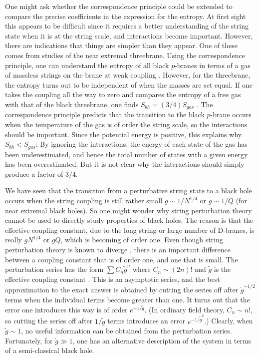 One might ask whether the correspondence principle could be extended to compare
the precise coefficients in the expression for the entropy. At first sight
this appears to be difficult since it requires a better understanding
of the string state when it is at the string scale, and interactions become
important. However,
there are indications that things are simpler than they appear.
One of these comes from studies of the near extremal threebrane.
Using the correspondence principle, one can understand the entropy of
all black $p$-branes in terms of a gas of massless strings on the brane
at weak coupling \cite{hopo}. However, for the threebrane, the entropy
turns out to be independent of when the masses are set equal. If one
takes the coupling all the way to zero and compares the entropy of a
free gas with that of the  black threebrane, one finds $S_{bh} = (3/4) S_{gas}$
\cite{gkp}.
The correspondence principle predicts that
the transition to the black $p$-brane occurs when the temperature
of the gas is of order the string scale, so the interactions should be
important. Since the potential energy is positive, 
this explains why $S_{bh} < S_{gas}$: 
By ignoring the interactions,
the energy of each state of the gas
has been underestimated, and hence the total number
of states with a given energy has been overestimated. But it is not clear
why the interactions  should simply produce a factor of $3/4$.

We have seen that the transition from a perturbative string state to
a black hole occurs when the string coupling is still rather small
$g\sim 1/ N^{1/4}$ or $g\sim 1/Q$ (for near extremal black holes).
So one might wonder why
string perturbation theory cannot be used to directly study properties of
black holes. The reason is that the effective coupling constant, due
to the long string or large number of D-branes, is really $g N^{1/4}$
or $gQ$, which is becoming of order one. Even though string perturbation
theory
is known to diverge \cite{grpe}, there is an important difference between
a coupling constant that is of order one, and one that is small.
The perturbation series has the form $\sum C_n \tilde g^n$ where
$C_n \sim (2n)!$ and $\tilde g$ is the effective coupling constant \cite{she}.
This is an asymptotic series, and the best approximation to the exact
answer is obtained by cutting the series off after $\tilde g^{-1/2}$ terms
when the individual terms become greater than one. 
It turns out that the error one introduces
this way is of order $e^{-1/\tilde g}$. (In ordinary field theory, $C_n \sim
n!$, so cutting the series off after $1/\tilde g$ terms introduces an error
$e^{-1/\tilde g^2}$.) Clearly, when $\tilde g \sim 1$, no useful information
can be obtained from the perturbation series. Fortunately, for $\tilde g \gg 1$,
one has an alternative description of the system in terms of a 
semi-classical black hole.


